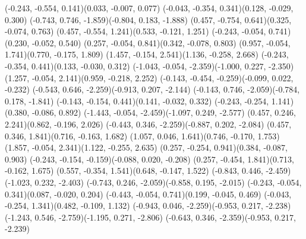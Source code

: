 \pstThreeDLine[linecolor=gray](-0.243, -0.554, 0.141)(0.033, -0.007, 0.077)
\pstThreeDLine[linecolor=gray](-0.043, -0.354, 0.341)(0.128, -0.029, 0.300)
\pstThreeDLine[linecolor=gray](-0.743, 0.746, -1.859)(-0.804, 0.183, -1.888)
\pstThreeDLine[linecolor=gray](0.457, -0.754, 0.641)(0.325, -0.074, 0.763)
\pstThreeDLine[linecolor=gray](0.457, -0.554, 1.241)(0.533, -0.121, 1.251)
\pstThreeDLine[linecolor=gray](-0.243, -0.054, 0.741)(0.230, -0.052, 0.540)
\pstThreeDLine[linecolor=gray](0.257, -0.054, 0.841)(0.342, -0.078, 0.803)
\pstThreeDLine[linecolor=gray](0.957, -0.054, 1.741)(0.770, -0.175, 1.809)
\pstThreeDLine[linecolor=gray](1.457, -0.154, 2.541)(1.136, -0.258, 2.668)
\pstThreeDLine[linecolor=gray](-0.243, -0.354, 0.441)(0.133, -0.030, 0.312)
\pstThreeDLine[linecolor=gray](-1.043, -0.054, -2.359)(-1.000, 0.227, -2.350)
\pstThreeDLine[linecolor=gray](1.257, -0.054, 2.141)(0.959, -0.218, 2.252)
\pstThreeDLine[linecolor=gray](-0.143, -0.454, -0.259)(-0.099, 0.022, -0.232)
\pstThreeDLine[linecolor=gray](-0.543, 0.646, -2.259)(-0.913, 0.207, -2.144)
\pstThreeDLine[linecolor=gray](-0.143, 0.746, -2.059)(-0.784, 0.178, -1.841)
\pstThreeDLine[linecolor=gray](-0.143, -0.154, 0.441)(0.141, -0.032, 0.332)
\pstThreeDLine[linecolor=gray](-0.243, -0.254, 1.141)(0.380, -0.086, 0.892)
\pstThreeDLine[linecolor=gray](-1.443, -0.054, -2.459)(-1.097, 0.249, -2.577)
\pstThreeDLine[linecolor=gray](0.457, 0.246, 2.241)(0.862, -0.196, 2.026)
\pstThreeDLine[linecolor=gray](-0.443, 0.346, -2.259)(-0.887, 0.202, -2.084)
\pstThreeDLine[linecolor=gray](0.457, 0.346, 1.841)(0.716, -0.163, 1.682)
\pstThreeDLine[linecolor=gray](1.057, 0.046, 1.641)(0.746, -0.170, 1.753)
\pstThreeDLine[linecolor=gray](1.857, -0.054, 2.341)(1.122, -0.255, 2.635)
\pstThreeDLine[linecolor=gray](0.257, -0.254, 0.941)(0.384, -0.087, 0.903)
\pstThreeDLine[linecolor=gray](-0.243, -0.154, -0.159)(-0.088, 0.020, -0.208)
\pstThreeDLine[linecolor=gray](0.257, -0.454, 1.841)(0.713, -0.162, 1.675)
\pstThreeDLine[linecolor=gray](0.557, -0.354, 1.541)(0.648, -0.147, 1.522)
\pstThreeDLine[linecolor=gray](-0.843, 0.446, -2.459)(-1.023, 0.232, -2.403)
\pstThreeDLine[linecolor=gray](-0.743, 0.246, -2.059)(-0.858, 0.195, -2.015)
\pstThreeDLine[linecolor=gray](-0.243, -0.054, 0.341)(0.087, -0.020, 0.204)
\pstThreeDLine[linecolor=gray](-0.443, -0.054, 0.741)(0.199, -0.045, 0.469)
\pstThreeDLine[linecolor=gray](-0.043, -0.254, 1.341)(0.482, -0.109, 1.132)
\pstThreeDLine[linecolor=gray](-0.943, 0.046, -2.259)(-0.953, 0.217, -2.238)
\pstThreeDLine[linecolor=gray](-1.243, 0.546, -2.759)(-1.195, 0.271, -2.806)
\pstThreeDLine[linecolor=gray](-0.643, 0.346, -2.359)(-0.953, 0.217, -2.239)
